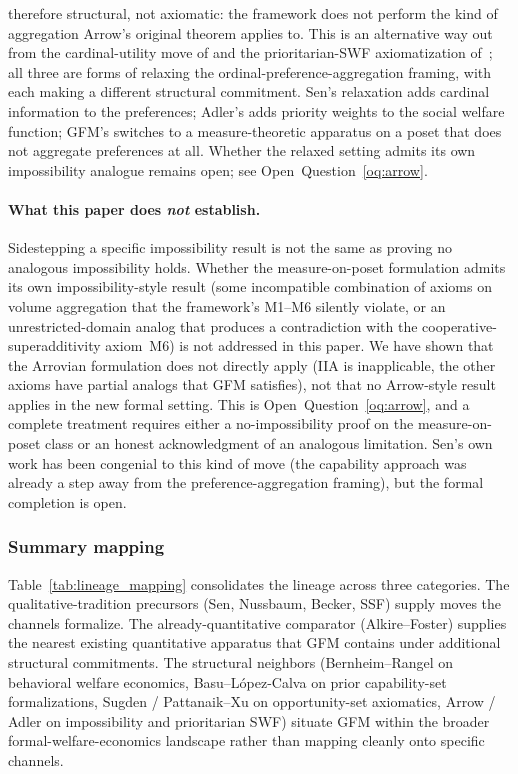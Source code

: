therefore structural, not axiomatic: the framework does not
perform the kind of aggregation Arrow's original theorem
applies to.  This is an alternative way out from the
cardinal-utility move of \citep{sen1970collective} and the
prioritarian-SWF axiomatization
of~\citep{adler2012wellbeing}; all three are forms of relaxing
the ordinal-preference-aggregation framing, with each making a
different structural commitment.  Sen's relaxation adds
cardinal information to the preferences; Adler's adds priority
weights to the social welfare function; GFM's switches to a
measure-theoretic apparatus on a poset that does not aggregate
preferences at all.  Whether the relaxed setting admits its own
impossibility analogue remains open; see
Open~Question~\ref{oq:arrow}.

\paragraph{What this paper does \emph{not} establish.}
Sidestepping a specific impossibility result is not the same as
proving no analogous impossibility holds.  Whether the
measure-on-poset formulation admits its own impossibility-style
result (some incompatible combination of axioms on volume
aggregation that the framework's M1--M6 silently violate, or an
unrestricted-domain analog that produces a contradiction with
the cooperative-superadditivity axiom~M6) is not addressed in
this paper.  We have shown that the Arrovian formulation does
not directly apply (IIA is inapplicable, the other axioms have
partial analogs that GFM satisfies), not that no Arrow-style
result applies in the new formal setting.  This is
Open~Question~\ref{oq:arrow}, and a complete treatment requires
either a no-impossibility proof on the measure-on-poset class
or an honest acknowledgment of an analogous limitation.  Sen's
own work has been congenial to this kind of move (the
capability approach was already a step away from the
preference-aggregation framing), but the formal completion is
open.

\subsubsection{Summary mapping}

Table~\ref{tab:lineage_mapping} consolidates the lineage across
three categories.  The qualitative-tradition precursors (Sen,
Nussbaum, Becker, SSF) supply moves the channels formalize.  The
already-quantitative comparator (Alkire--Foster) supplies the
nearest existing quantitative apparatus that GFM contains under
additional structural commitments.  The structural neighbors
(Bernheim--Rangel on behavioral welfare economics,
Basu--L\'opez-Calva on prior capability-set formalizations,
Sugden / Pattanaik--Xu on opportunity-set axiomatics, Arrow /
Adler on impossibility and prioritarian SWF) situate GFM
within the broader formal-welfare-economics landscape rather
than mapping cleanly onto specific channels.

